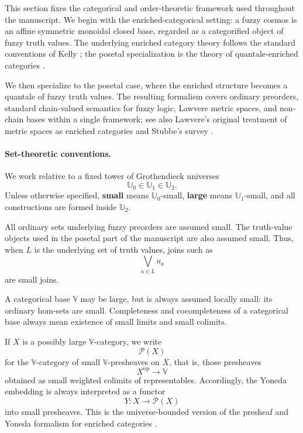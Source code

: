 This section fixes the categorical and order-theoretic framework used throughout the manuscript. We begin with the enriched-categorical setting: a fuzzy cosmos is an affine symmetric monoidal closed base, regarded as a categorified object of fuzzy truth values. The underlying enriched category theory follows the standard conventions of Kelly \cite[Sections~1.1--1.6]{Kelly1982BasicConcepts}; the posetal specialization is the theory of quantale-enriched categories \cite[Definitions~2.1 and~2.2]{stubbe-2014-quantaloid-enriched}.

We then specialize to the posetal case, where the enriched structure becomes a quantale of fuzzy truth values. The resulting formalism covers ordinary preorders, standard chain-valued semantics for fuzzy logic, Lawvere metric spaces, and non-chain bases within a single framework; see also Lawvere's original treatment of metric spaces as enriched categories \cite{Lawvere1973MetricSpaces} and Stubbe's survey \cite[Examples~2.3 and~2.4]{stubbe-2014-quantaloid-enriched}.

\paragraph{Set-theoretic conventions.}
We work relative to a fixed tower of Grothendieck universes
\[
    \mathbb U_0\in \mathbb U_1\in \mathbb U_2.
\]
Unless otherwise specified, \textbf{small} means \(\mathbb U_0\)-small, \textbf{large} means \(\mathbb U_1\)-small, and all constructions are formed inside \(\mathbb U_2\).

All ordinary sets underlying fuzzy preorders are assumed small. The truth-value objects used in the posetal part of the manuscript are also assumed small. Thus, when \(L\) is the underlying set of truth values, joins such as
\[
    \bigvee_{a\in L} u_a
\]
are small joins.

A categorical base \(\mathbb V\) may be large, but is always assumed locally small: its ordinary hom-sets are small. Completeness and cocompleteness of a categorical base always mean existence of small limits and small colimits.

If \(X\) is a possibly large \(\mathbb V\)-category, we write
\[
    \mathcal P(X)
\]
for the \(\mathbb V\)-category of small \(\mathbb V\)-presheaves on \(X\), that is, those presheaves
\[
    X^{\mathrm{op}}\longrightarrow \mathbb V
\]
obtained as small weighted colimits of representables. Accordingly, the Yoneda embedding is always interpreted as a functor
\[
    Y:X\longrightarrow \mathcal P(X)
\]
into small presheaves. This is the universe-bounded version of the presheaf and Yoneda formalism for enriched categories \cite[Sections~1.6 and~1.9]{Kelly1982BasicConcepts}.

